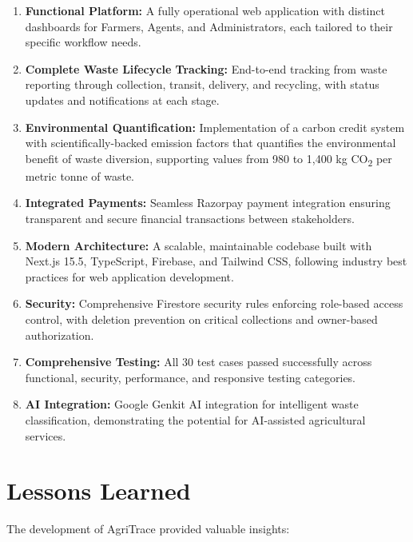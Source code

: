 \documentclass[a4paper,12pt,oneside]{report}
\let\originalitem\item
\renewcommand{\item}{\Needspace{10\baselineskip}\originalitem}
\begin{document}
\begin{enumerate}
    \item \textbf{Functional Platform:} A fully operational web application with distinct dashboards for Farmers, Agents, and Administrators, each tailored to their specific workflow needs.

    \item \textbf{Complete Waste Lifecycle Tracking:} End-to-end tracking from waste reporting through collection, transit, delivery, and recycling, with status updates and notifications at each stage.

    \item \textbf{Environmental Quantification:} Implementation of a carbon credit system with scientifically-backed emission factors that quantifies the environmental benefit of waste diversion, supporting values from 980 to 1,400 kg CO\textsubscript{2} per metric tonne of waste.

    \item \textbf{Integrated Payments:} Seamless Razorpay payment integration ensuring transparent and secure financial transactions between stakeholders.

    \item \textbf{Modern Architecture:} A scalable, maintainable codebase built with Next.js 15.5, TypeScript, Firebase, and Tailwind CSS, following industry best practices for web application development.

    \item \textbf{Security:} Comprehensive Firestore security rules enforcing role-based access control, with deletion prevention on critical collections and owner-based authorization.

    \item \textbf{Comprehensive Testing:} All 30 test cases passed successfully across functional, security, performance, and responsive testing categories.

    \item \textbf{AI Integration:} Google Genkit AI integration for intelligent waste classification, demonstrating the potential for AI-assisted agricultural services.
\end{enumerate}

\section{Lessons Learned}

\noindent The development of AgriTrace provided valuable insights:
\end{document}
